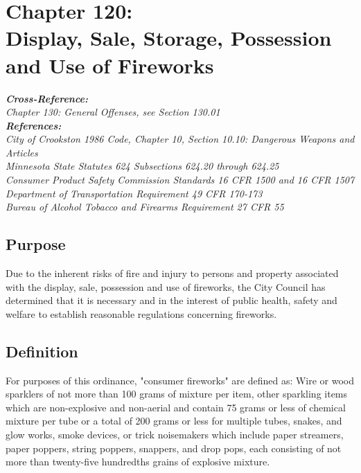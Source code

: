 \chapter*{Chapter 120: \\
	Display, Sale, Storage, Possession and Use of Fireworks}
    \vfill
    \minitoc
    \emph{\textbf{Cross-Reference:}\\
        {\indent}Chapter 130: General Offenses, see Section 130.01}\\
    \indent\emph{\textbf{References:}\\
        {\indent}City of Crookston 1986 Code, Chapter 10, Section 10.10: Dangerous Weapons and Articles\\
        {\indent}Minnesota State Statutes 624 Subsections 624.20 through 624.25\\
        {\indent}Consumer Product Safety Commission Standards 16 CFR 1500 and 16 CFR 1507\\
        {\indent}Department of Transportation Requirement 49 CFR 170-173\\
        {\indent}Bureau of Alcohol Tobacco and Firearms Requirement 27 CFR 55}
    \pagebreak

\section{Purpose}
Due to the inherent risks of fire and injury to persons and property associated with the display, sale, possession and use of fireworks, the City Council has determined that it is necessary and in the interest of public health, safety and welfare to establish reasonable regulations concerning fireworks.

\section{Definition}
For purposes of this ordinance, "consumer fireworks" are defined as: Wire or wood sparklers of not more than 100 grams of mixture per item, other sparkling items which are non-explosive and non-aerial and contain 75 grams or less of chemical mixture per tube or a total of 200 grams or less for multiple tubes, snakes, and glow works, smoke devices, or trick noisemakers which include paper streamers, paper poppers, string poppers, snappers, and drop pops, each consisting of not more than twenty-five hundredths grains of explosive mixture.

